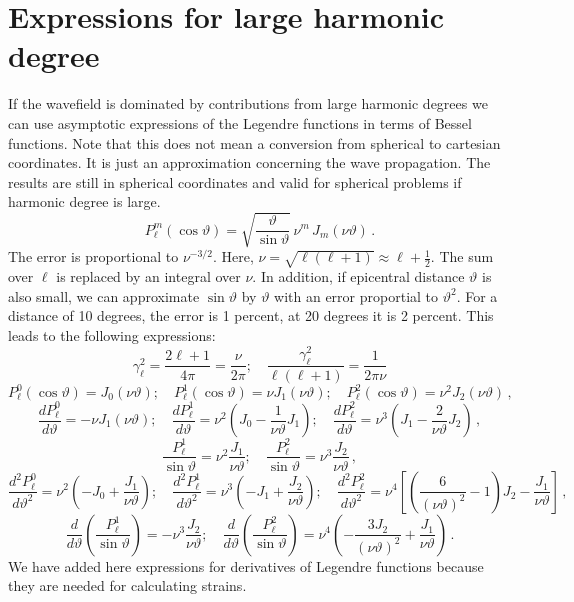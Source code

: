 \documentclass[12pt,a4paper]{article}
\begin{document}
\section{Expressions for large harmonic degree}
If the wavefield is dominated by contributions from large harmonic degrees we can use asymptotic expressions of the Legendre functions in terms of Bessel functions. Note that this does not mean a conversion from spherical to cartesian coordinates. It is just an approximation concerning the wave propagation. The results are still in spherical coordinates and valid for spherical problems if harmonic degree is large.
\begin{displaymath}
P_\ell^m(\cos\vartheta) = \sqrt{\frac{\vartheta}{\sin\vartheta}}\,\nu^m\,J_m(\nu\vartheta) \,.
\end{displaymath}
The error is proportional to $\nu^{-3/2}$. Here, $\nu = \sqrt{\ell(\ell+1)} \approx \ell+\frac{1}{2}$. The sum over $\ell$ is replaced by an integral over $\nu$. In addition, if epicentral distance $\vartheta$ is also small, we can approximate $\sin\vartheta$ by $\vartheta$ with an error proportial to $\vartheta^2$. For a distance of 10 degrees, the error is 1 percent, at 20 degrees it is 2 percent. This leads to the following expressions:
\begin{displaymath}
\gamma_\ell^2=\frac{2\ell+1}{4\pi} = \frac{\nu}{2\pi}; \quad \frac{\gamma_\ell^2}{\ell(\ell+1)} = \frac{1}{2\pi\nu}
\end{displaymath}
\begin{displaymath}
P_\ell^0(\cos\vartheta) = J_0(\nu\vartheta); \quad P_\ell^1(\cos\vartheta) = \nu J_1(\nu\vartheta); \quad P_\ell^2(\cos\vartheta) = \nu^2 J_2(\nu\vartheta)\,,
\end{displaymath}
\begin{displaymath}
\frac{dP_\ell^0}{d\vartheta} = -\nu J_1(\nu\vartheta); \quad \frac{dP_\ell^1}{d\vartheta} = \nu^2(J_0-\frac{1}{\nu\vartheta}J_1);  \quad \frac{dP_\ell^2}{d\vartheta} = \nu^3(J_1-\frac{2}{\nu\vartheta}J_2) \,,
\end{displaymath}
\begin{displaymath}
\frac{P_\ell^1}{\sin\vartheta} = \nu^2 \frac{J_1}{\nu\vartheta}; \quad \frac{P_\ell^2}{\sin\vartheta} = \nu^3 \frac{J_2}{\nu\vartheta}\,,
\end{displaymath}
\begin{displaymath}
\frac{d^2P_\ell^0}{d\vartheta^2} = \nu^2(-J_0+\frac{J_1}{\nu\vartheta}); \quad \frac{d^2P_\ell^1}{d\vartheta^2} = \nu^3(-J_1+\frac{J_2}{\nu\vartheta});  \quad \frac{d^2P_\ell^2}{d\vartheta^2} = \nu^4\left[\left(\frac{6}{(\nu\vartheta)^2}-1\right)J_2-\frac{J_1}{\nu\vartheta}\right] \,,
\end{displaymath}
\begin{displaymath}
\frac{d}{d\vartheta}\left(\frac{P_\ell^1}{\sin\vartheta}\right) = -\nu^3 \frac{J_2}{\nu\vartheta}; \quad \frac{d}{d\vartheta}\left(\frac{P_\ell^2}{\sin\vartheta}\right) = \nu^4\left( -\frac{3J_2}{(\nu\vartheta)^2}+\frac{J_1}{\nu\vartheta}\right)\,.
\end{displaymath}
We have added here expressions for derivatives of Legendre functions because they are needed for calculating strains.
\end{document}
